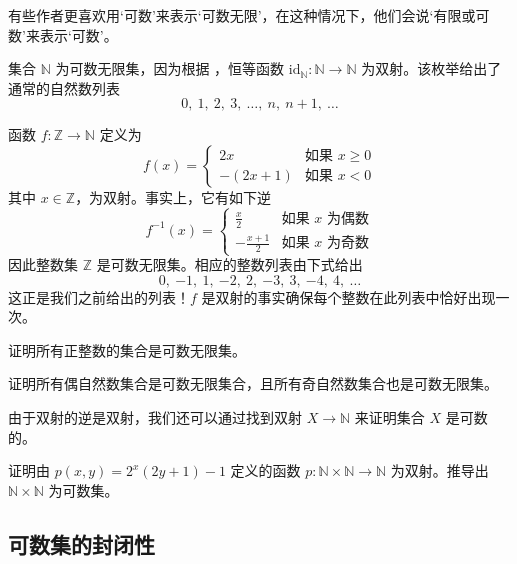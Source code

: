 有些作者更喜欢用`可数'来表示`可数无限'，在这种情况下，他们会说`有限或可数'来表示`可数'。

\begin{example}
\label{exNIsCountable}
集合 $\mathbb{N}$ 为可数无限集，因为根据 ，恒等函数 $\mathrm{id}_{\mathbb{N}} : \mathbb{N} \to \mathbb{N}$ 为双射。该枚举给出了通常的自然数列表
\[ 0,~ 1,~ 2,~ 3,~ \dots,~ n,~ n+1,~ \dots \]
\end{example}

\begin{example}
\label{exZIsCountable}
函数 $f : \mathbb{Z} \to \mathbb{N}$ 定义为
\[ f(x) = \begin{cases} 2x & \text{如果 } x \ge 0 \\ -(2x+1) & \text{如果 } x < 0 \end{cases} \]
其中 $x \in \mathbb{Z}$，为双射。事实上，它有如下逆
\[ f^{-1}(x) = \begin{cases} \frac{x}{2} & \text{如果 } x \text{ 为偶数} \\ -\frac{x+1}{2} & \text{如果 } x \text{ 为奇数} \end{cases} \]
因此整数集 $\mathbb{Z}$ 是可数无限集。相应的整数列表由下式给出
\[ 0,\ {-1},\ 1,\ {-2},\ 2,\ {-3},\ 3,\ {-4},\ 4,\ \dots \]
这正是我们之前给出的列表！$f$ 是双射的事实确保每个整数在此列表中恰好出现一次。
\end{example}

\begin{exercise}
\label{exPositiveIntegersCountablyInfinite}
证明所有正整数的集合是可数无限集。
\end{exercise}

\begin{exercise}
\label{exEvenOddNaturalNumbersCountablyInfinite}
证明所有偶自然数集合是可数无限集合，且所有奇自然数集合也是可数无限集。
\end{exercise}

由于双射的逆是双射，我们还可以通过找到双射 $X \to \mathbb{N}$ 来证明集合 $X$ 是可数的。

\begin{exercise}
证明由 $p(x,y) = 2^x(2y+1)-1$ 定义的函数 $p : \mathbb{N} \times \mathbb{N} \to \mathbb{N}$ 为双射。推导出 $\mathbb{N} \times \mathbb{N}$ 为可数集。
\end{exercise}

\subsection*{可数集的封闭性}

